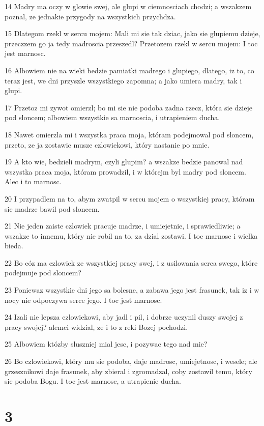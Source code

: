 \par 14 Madry ma oczy w glowie swej, ale glupi w ciemnosciach chodzi; a wszakzem poznal, ze jednakie przygody na wszystkich przychdza.
\par 15 Dlategom rzekl w sercu mojem: Mali mi sie tak dziac, jako sie glupiemu dzieje, przeczzem go ja tedy madroscia przeszedl? Przetozem rzekl w sercu mojem: I toc jest marnosc.
\par 16 Albowiem nie na wieki bedzie pamiatki madrego i glupiego, dlatego, iz to, co teraz jest, we dni przyszle wszystkiego zapomna; a jako umiera madry, tak i glupi.
\par 17 Przetoz mi zywot omierzl; bo mi sie nie podoba zadna rzecz, która sie dzieje pod sloncem; albowiem wszystkie sa marnoscia, i utrapieniem ducha.
\par 18 Nawet omierzla mi i wszystka praca moja, któram podejmowal pod sloncem, przeto, ze ja zostawic musze czlowiekowi, który nastanie po mnie.
\par 19 A kto wie, bedzieli madrym, czyli glupim? a wszakze bedzie panowal nad wszystka praca moja, któram prowadzil, i w którejm byl madry pod sloncem. Alec i to marnosc.
\par 20 I przypadlem na to, abym zwatpil w sercu mojem o wszystkiej pracy, któram sie madrze bawil pod sloncem.
\par 21 Nie jeden zaiste czlowiek pracuje madrze, i umiejetnie, i sprawiedliwie; a wszakze to innemu, który nie robil na to, za dzial zostawi. I toc marnosc i wielka bieda.
\par 22 Bo cóz ma czlowiek ze wszystkiej pracy swej, i z usilowania serca swego, które podejmuje pod sloncem?
\par 23 Poniewaz wszystkie dni jego sa bolesne, a zabawa jego jest frasunek, tak iz i w nocy nie odpoczywa serce jego. I toc jest marnosc.
\par 24 Izali nie lepsza czlowiekowi, aby jadl i pil, i dobrze uczynil duszy swojej z pracy swojej? alemci widzial, ze i to z reki Bozej pochodzi.
\par 25 Albowiem któzby sluszniej mial jesc, i pozywac tego nad mie?
\par 26 Bo czlowiekowi, który mu sie podoba, daje madrosc, umiejetnosc, i wesele; ale grzesznikowi daje frasunek, aby zbieral i zgromadzal, coby zostawil temu, który sie podoba Bogu. I toc jest marnosc, a utrapienie ducha.

\chapter{3}

